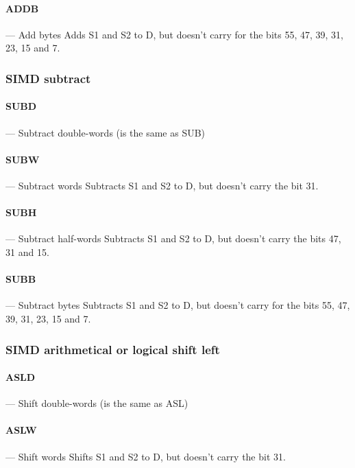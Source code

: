 \documentclass[11pt]{article}
\begin{document}
\paragraph{ADDB} --- Add bytes\newline
Adds S1 and S2 to D, but doesn't carry for the bits 55, 47, 39, 31, 23, 15 and
7.

\subsubsection{SIMD subtract}

\paragraph{SUBD} --- Subtract double-words (is the same as SUB)\newline

\paragraph{SUBW} --- Subtract words\newline
Subtracts S1 and S2 to D, but doesn't carry the bit 31.

\paragraph{SUBH} --- Subtract half-words\newline
Subtracts S1 and S2 to D, but doesn't carry the bits 47, 31 and 15.

\paragraph{SUBB} --- Subtract bytes\newline
Subtracts S1 and S2 to D, but doesn't carry for the bits 55, 47, 39, 31, 23, 15
and 7.

\subsubsection{SIMD arithmetical or logical shift left}

\paragraph{ASLD} --- Shift double-words (is the same as ASL)\newline

\paragraph{ASLW} --- Shift words\newline
Shifts S1 and S2 to D, but doesn't carry the bit 31.
\end{document}
